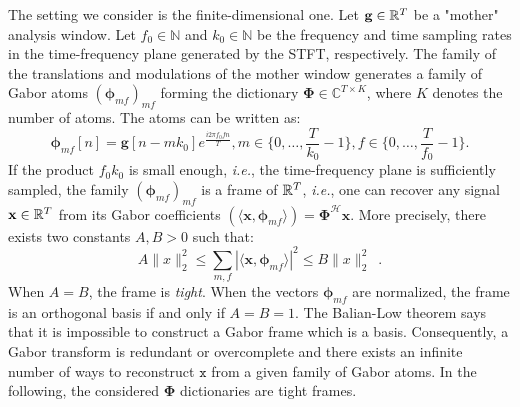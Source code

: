 The setting we consider is the finite-dimensional one. Let $\mathbf{g}\in \mathbb{R}^{T}$ be a "mother" analysis window. Let $f_0\in \mathbb{N}$ and $k_0\in \mathbb{N}$ be the frequency and time sampling rates in the time-frequency plane generated by the STFT, respectively. The family of the translations and modulations of the mother window generates a family of Gabor atoms $(\mathbf{\phi}_{mf})_{mf}$ forming the dictionary $\mathbf{\Phi}\in \mathbb{C}^{T\times K}$, where $K$ denotes the number of atoms. The atoms can be written as:
\begin{equation} \label{eq_gabor_atoms}
	\mathbf{\phi}_{mf}[n] = \mathbf{g}[n-mk_0]e^{\frac{i2\pi f_0 fn}{T}}, m\in \{0,\dots ,\frac{T}{k_0}-1\}, f\in \{0,\dots ,\frac{T}{f_0}-1\}.
\end{equation}
If the product $f_0k_0$ is small enough, \textit{i.e.}, the time-frequency plane is sufficiently sampled, the family $(\mathbf{\phi}_{mf})_{mf}$ is a frame of $\mathbb{R}^T$, \textit{i.e.}, one can recover any signal $\mathbf{x}\in \mathbb{R}^T$ from its Gabor coefficients $(\langle \mathbf{x}, \mathbf{\phi}_{mf}\rangle)=\mathbf{\Phi}^{\mathcal{H}}\mathbf{x}$. More precisely, there exists two constants $A, B > 0$ such that:
\begin{equation} \label{eq_frame}
	A\|x\|_2^2 \leq \sum_{m,f}|\langle \mathbf{x}, \mathbf{\phi}_{mf}\rangle|^2\leq B\|x\|_2^2 \enspace .
\end{equation}
When $A=B$, the frame is \textit{tight}. When the vectors $\mathbf{\phi}_{mf}$ are normalized, the frame is an orthogonal basis if and only if $A=B=1$. The Balian-Low theorem says that it is impossible to construct a Gabor frame which is a basis. Consequently, a Gabor transform is redundant or overcomplete and there exists an infinite number of ways to reconstruct $\mathtt{x}$ from a given family of Gabor atoms. In the following, the considered $\mathbf{\Phi}$ dictionaries are tight frames.

